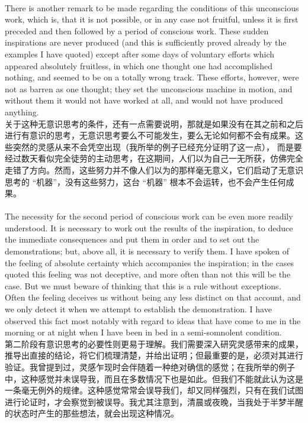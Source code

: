 \documentclass{article}
\begin{document}
\\
There is another remark to be made regarding the conditions of this unconscious work, which is, that it is not possible, or in any case not fruitful, unless it is first preceded and then followed by a period of conscious work. These sudden inspirations are never produced (and this is sufficiently proved already by the examples I have quoted) except after some days of voluntary efforts which appeared absolutely fruitless, in which one thought one had accomplished nothing, and seemed to be on a totally wrong track. These efforts, however, were not as barren as one thought; they set the unconscious machine in motion, and without them it would not have worked at all, and would not have produced anything.\\
关于这种无意识思考的条件，还有一点需要说明，那就是如果没有在其之前和之后进行有意识的思考，无意识思考要么不可能发生，要么无论如何都不会有成果。这些突然的灵感从来不会凭空出现（我所举的例子已经充分证明了这一点）， 而是要经过数天看似完全徒劳的主动思考，在这期间，人们以为自己一无所获，仿佛完全走错了方向。然而，这些努力并不像人们以为的那样毫无意义，它们启动了无意识思考的 “机器”，没有这些努力，这台 “机器” 根本不会运转，也不会产生任何成果。 \\

\\
The necessity for the second period of conscious work can be even more readily understood. It is necessary to work out the results of the inspiration, to deduce the immediate consequences and put them in order and to set out the demonstrations; but, above all, it is necessary to verify them. I have spoken of the feeling of absolute certainty which accompanies the inspiration; in the cases quoted this feeling was not deceptive, and more often than not this will be the case. But we must beware of thinking that this is a rule without exceptions. Often the feeling deceives us without being any less distinct on that account, and we only detect it when we attempt to establish the demonstration. I have observed this fact most notably with regard to ideas that have come to me in the morning or at night when I have been in bed in a semi-somnolent condition.\\
第二阶段有意识思考的必要性则更易于理解。我们需要深入研究灵感带来的成果，推导出直接的结论，将它们梳理清楚，并给出证明；但最重要的是，必须对其进行验证。我曾提到过，灵感乍现时会伴随着一种绝对确信的感觉；在我所举的例子中，这种感觉并未误导我，而且在多数情况下也是如此。但我们不能就此认为这是一条毫无例外的规律。这种感觉常常会误导我们，却又同样强烈，只有在我们试图进行论证时，才会察觉到被误导。我尤其注意到，清晨或夜晚，当我处于半梦半醒的状态时产生的那些想法，就会出现这种情况。 \\ 
\end{document}
